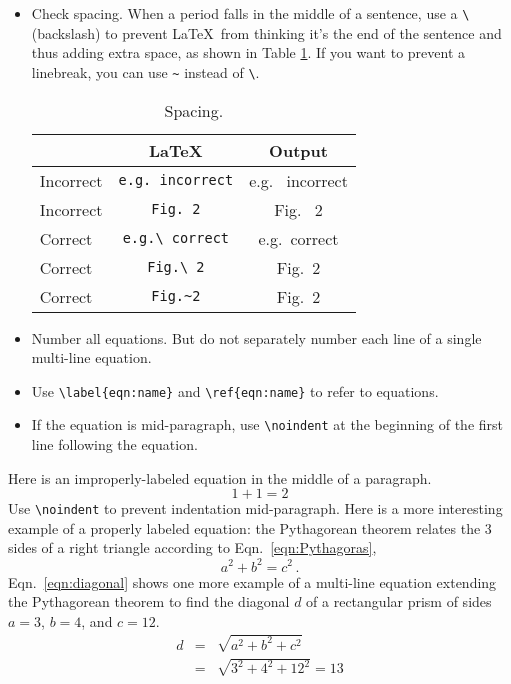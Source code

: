 \begin{itemize}[label=$\Box$]
\item Check spacing. When a period falls in the middle of a sentence, use a {\tt \textbackslash} (backslash) to prevent \LaTeX\ from thinking it's the end of the sentence and thus adding extra space, as shown in Table \ref{tab:spacing}. If you want to prevent a linebreak, you can use {\tt \textasciitilde} instead of {\tt \textbackslash}.
\begin{table}[h!]
  \begin{center}
    \caption{Spacing.}
    \label{tab:spacing}
    \begin{tabular}{l|c|c} %
      \hline
       & \LaTeX & Output \\
      \hline \hline
      Incorrect & {\tt e.g.\ incorrect} & e.g. \ incorrect \\
      Incorrect & {\tt Fig.\ 2} & Fig. \ 2 \\
      Correct & {\tt e.g.\textbackslash\ correct} & e.g.\ correct \\
      Correct & {\tt Fig.\textbackslash\ 2} & Fig.\ 2 \\
      Correct & {\tt Fig.\textasciitilde 2} & Fig.~2 \\
      \hline
    \end{tabular}
  \end{center}
\end{table}

\item Number all equations. But do not separately number each line of a single multi-line equation.
\item Use {\tt \textbackslash label\{eqn:name\}} and {\tt \textbackslash ref\{eqn:name\}} to refer to equations.
\item If the equation is mid-paragraph, use {\tt \textbackslash noindent} at the beginning of the first line following the equation.
\end{itemize}
\vspace{2mm}

 Here is an improperly-labeled equation in the middle of a paragraph.
\[
1+1=2
\]
\noindent Use {\tt \textbackslash noindent} to prevent indentation mid-paragraph. Here is a more interesting example of a properly labeled equation: the Pythagorean theorem relates the 3 sides of a right triangle according to Eqn.\ \ref{eqn:Pythagoras},
\begin{equation}
a^2+b^2=c^2 \,.
\label{eqn:Pythagoras}
\end{equation}
\noindent Eqn.\ \ref{eqn:diagonal} shows one more example of a multi-line equation extending the Pythagorean theorem to find the diagonal $d$ of a rectangular prism of sides $a=3$, $b=4$, and $c=12$.
\begin{eqnarray}
\label{eqn:diagonal}
\nonumber d & = & \sqrt{a^2 + b^2 + c^2} \\
& = & \sqrt{3^2+4^2+12^2} = 13
\end{eqnarray}

